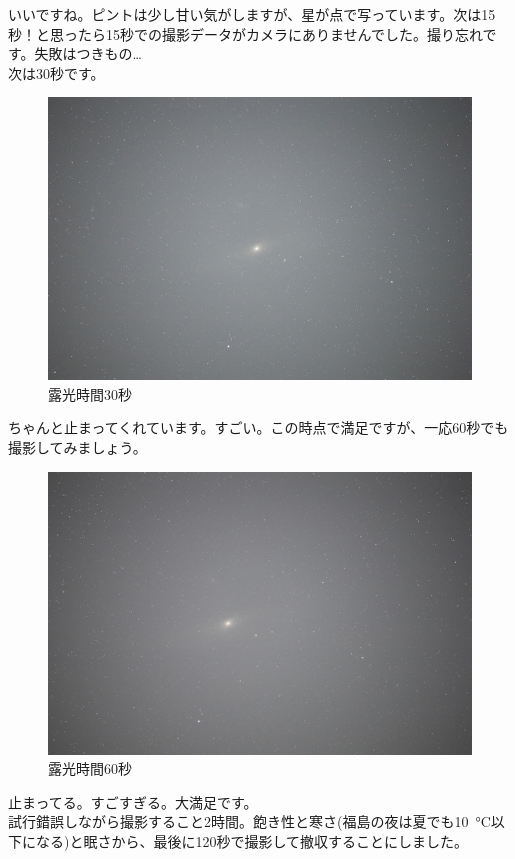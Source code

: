\noindent
いいですね。ピントは少し甘い気がしますが、星が点で写っています。次は15秒！と思ったら15秒での撮影データがカメラにありませんでした。撮り忘れです。失敗はつきもの\dots\\

次は30秒です。

\begin{figure}[H]
  \centering
  \includegraphics[width=0.7\linewidth]{sections/Kokubun/pictures/ss30.JPG}
  \caption{露光時間30秒}
  \label{ss30}
\end{figure}

\noindent
ちゃんと止まってくれています。すごい。この時点で満足ですが、一応60秒でも撮影してみましょう。

\begin{figure}[H]
  \centering
  \includegraphics[width=0.7\linewidth]{sections/Kokubun/pictures/ss60.JPG}
  \caption{露光時間60秒}
  \label{ss60}
\end{figure}

\noindent
止まってる。すごすぎる。大満足です。\\

試行錯誤しながら撮影すること2時間。飽き性と寒さ(福島の夜は夏でも\SI{10}{\degreeCelsius}以下になる)と眠さから、最後に120秒で撮影して撤収することにしました。

